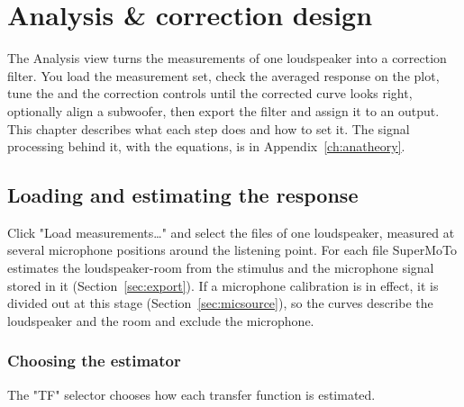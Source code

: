 \chapter{Analysis \& correction design}\label{ch:analysis}


The Analysis view turns the measurements of one loudspeaker into a correction filter. You load the measurement set, check the averaged response on the plot, tune the  and the correction controls until the corrected curve looks right, optionally align a subwoofer, then export the filter and assign it to an output. This chapter describes what each step does and how to set it. The signal processing behind it, with the equations, is in Appendix~\ref{ch:anatheory}.

\section{Loading and estimating the response}\label{sec:welch}
Click "Load measurements\ldots" and select the files of one loudspeaker, measured at several microphone positions around the listening point. For each file SuperMoTo estimates the loudspeaker-room  from the stimulus and the microphone signal stored in it (Section~\ref{sec:export}). If a microphone calibration is in effect, it is divided out at this stage (Section~\ref{sec:micsource}), so the curves describe the loudspeaker and the room and exclude the microphone.

\subsection{Choosing the estimator}
The "TF" selector chooses how each transfer function is estimated.

